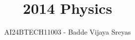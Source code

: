 \documentclass[journal]{IEEEtran}
\begin{document}

\vspace{3cm}

\title{2014 Physics}
\author{AI24BTECH11003 - Badde Vijaya Sreyas}
{\let\newpage\relax\maketitle}

\renewcommand{\thefigure}{\theenumi}
\renewcommand{\thetable}{\theenumi}
\setlength{\intextsep}{10pt} %


\renewcommand{\thetable}{\theenumi}
\end{document}
